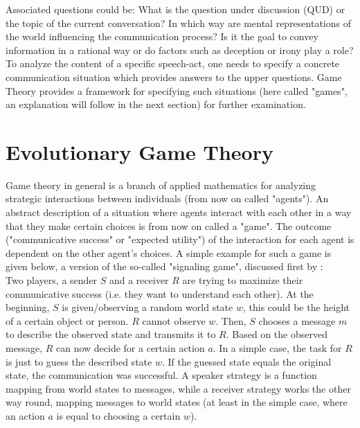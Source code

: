 Associated questions could be: What is the question under discussion (QUD) or the topic of the current conversation? In which way are mental representations of the world influencing the communication process? Is it the goal to convey information in a rational way or do factors such as deception or irony play a role?\\

To analyze the content of a specific speech-act, one needs to specify a concrete communication situation which provides answers to the upper questions. Game Theory provides a framework for specifying such situations (here called "games", an explanation will follow in the next section) for further examination.



\section{Evolutionary Game Theory}
\label{sec:egt}

Game theory in general is a branch of applied mathematics for analyzing strategic interactions between individuals (from now on called "agents").
An abstract description of a situation where agents interact with each other in a way that they make certain choices is from now on called a "game". The outcome ("communicative success" or "expected utility") of the interaction for each agent is dependent on the other agent's choices. A simple example for such a game is given below, a version of the so-called "signaling game", discussed first by \cite{lewis2008convention}:\\

Two players, a sender $S$ and a receiver $R$ are trying to maximize their communicative success (i.e. they want to understand each other).
At the beginning, $S$ is given/observing a random world state $w$, this could be the height of a certain object or person. $R$ cannot observe $w$. Then, $S$ chooses a message $m$ to describe the observed state and transmits it to $R$. Based on the observed message, $R$ can now decide for a certain action $a$. In a simple case, the task for $R$ is just to guess the described state $w$. If the guessed state equals the original state, the communication was successful.
A speaker strategy is a function mapping from world states to messages, while a receiver strategy works the other way round, mapping messages to world states (at least in the simple case, where an action $a$ is equal to choosing a certain $w$).\\

